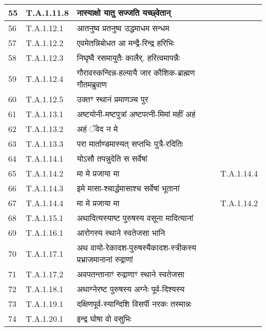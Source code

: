 \documentclass[17pt]{extarticle}
\begin{document}
\begin{longtable}{||p{0.4in}||p{0.9in}||p{4.0in}||p{0.9in}||}
        \hline
            55 & T.A.1.11.8 & नास्याक्षो यातु सज्जति यच्छ्वेतान् &      \\
        \hline
            56 & T.A.1.12.1 & आतनुष्व प्रतनुष्व उद्धमाधम सन्धम &      \\
        \hline
            57 & T.A.1.12.2 & एवमेतन्निबोधत आ मन्द्रै{-}रिन्द्र हरिभिः &      \\
        \hline
            58 & T.A.1.12.3 & निघृष्वै रसमायुतैः कालैर्. हरित्वमापन्नैः &      \\
        \hline
            59 & T.A.1.12.4 & गौरावस्कन्दिन्न{-}हल्यायै जार कौशिक{-}ब्राह्मण गौतमब्रुवाण &      \\
        \hline
            60 & T.A.1.12.5 & उक्तꣳ स्थानं प्रमाणञ्च पुर &      \\
        \hline
            61 & T.A.1.13.1 & अष्टयोनी{-}मष्टपुत्रां अष्टपत्नी{-}मिमां महीं अहं &      \\
        \hline
            62 & T.A.1.13.2 & अहं ॅवेद न मे &      \\
        \hline
            63 & T.A.1.13.3 & परा मार्ताण्डमास्यत् सप्तभिः पुत्रै{-}रदितिः &      \\
        \hline
            64 & T.A.1.14.1 & योऽसौ तपन्नुदेति स सर्वेषां &      \\
        \hline
            65 & T.A.1.14.2 & मा मे प्रजाया मा &  T.A.1.14.4       \\
        \hline
            66 & T.A.1.14.3 & इमे मासा{-}श्चार्द्धमासाश्च सर्वेषां भूतानां &      \\
        \hline
            67 & T.A.1.14.4 & मा मे प्रजाया मा & T.A.1.14.2        \\
        \hline
            68 & T.A.1.15.1 & अथादित्यस्याष्ट पुरुषस्य वसूना मादित्यानां &      \\
        \hline
            69 & T.A.1.16.1 & आरोगस्य स्थाने स्वतेजसा भानि &      \\
        \hline
            70 & T.A.1.17.1 & अथ वायो{-}रेकादश{-}पुरुषस्यैकादश{-}स्त्रीकस्य प्रभ्राजमानानां रुद्राणां &      \\
        \hline
            71 & T.A.1.17.2 & अवपतन्तानाꣳ रुद्राणाꣳ स्थाने स्वतेजसा &      \\
        \hline
            72 & T.A.1.18.1 & अथाग्नेरष्ट पुरुषस्य अग्नेः पूर्व{-}दिश्यस्य &      \\
        \hline
            73 & T.A.1.19.1 & दक्षिणपूर्व{-}स्यान्दिशि विसर्पी नरकः तस्मान्नः &      \\
        \hline
            74 & T.A.1.20.1 & इन्द्र घोषा वो वसुभिः &      \\

\end{longtable}
\end{document}
